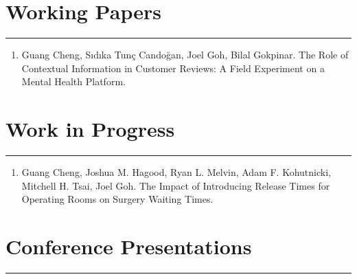 \documentclass[12pt, a4paper]{article}
\begin{document}
{\section*{Working Papers}
\vspace*{0.4em}
\hrule height 0.5pt

\begin{enumerate}[leftmargin=28pt, itemsep=6pt, parsep=0.2pt, topsep=1pt]

	\item Guang Cheng, S\i{}d\i{}ka Tun\c{c} Cando\u{g}an, Joel Goh, Bilal Gokpinar.
	The Role of Contextual Information in Customer Reviews: A Field Experiment on a Mental Health Platform.

\end{enumerate}




\section*{Work in Progress}
\vspace*{0.4em}
\hrule height 0.5pt

\begin{enumerate}[leftmargin=28pt, itemsep=6pt, parsep=0.2pt, topsep=1pt]

	\item Guang Cheng, Joshua M. Hagood, Ryan L. Melvin, Adam F. Kohutnicki, Mitchell H. Tsai, Joel Goh. The Impact of Introducing Release Times for Operating Rooms on Surgery Waiting Times.

\end{enumerate}




\section*{Conference Presentations}
\vspace*{0.4em}
\hrule height 0.5pt

\begin{itemize}[leftmargin=26pt, itemsep=8pt, parsep=0.2pt, topsep=1pt]


\end{itemize}}
\end{document}
